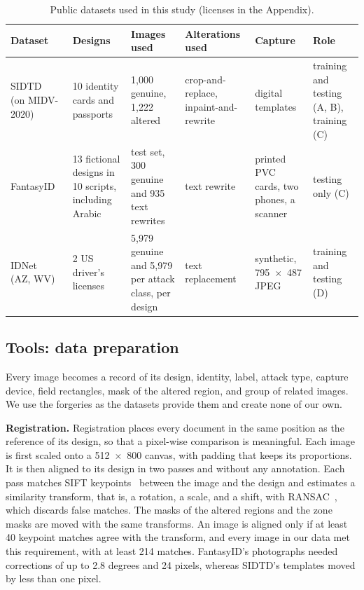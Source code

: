 \documentclass[12pt,a4paper]{article}
\begin{document}
\begin{table}[htbp]
\centering\footnotesize
\setlength{\tabcolsep}{3pt}
\renewcommand{\arraystretch}{1.1}
\caption{Public datasets used in this study (licenses in the Appendix).}
\label{tab:data}
\begin{tabular}{L{2.0cm}L{2.6cm}L{2.6cm}L{3.0cm}L{2.5cm}L{2.4cm}}
\toprule
Dataset & Designs & Images used & Alterations used & Capture & Role \\
\midrule
SIDTD~\cite{boned2024sidtd} (on MIDV-2020) & 10 identity cards and passports & 1,000 genuine, 1,222 altered & crop-and-replace, inpaint-and-rewrite & digital templates & training and testing (A, B), training (C) \\
FantasyID~\cite{korshunov2025fantasyid} & 13 fictional designs in 10 scripts, including Arabic & test set, 300 genuine and 935 text rewrites & text rewrite & printed PVC cards, two phones, a scanner & testing only (C) \\
IDNet~\cite{guan2024idnet} (AZ, WV) & 2 US driver's licenses & 5,979 genuine and 5,979 per attack class, per design & text replacement & synthetic, 795~$\times$~487 JPEG & training and testing (D) \\
\bottomrule
\end{tabular}
\end{table}


\subsection{Tools: data preparation}
\label{sec:prep}
Every image becomes a record of its design, identity, label, attack type, capture device, field rectangles, mask of the altered region, and group of related images. We use the forgeries as the datasets provide them and create none of our own.

\textbf{Registration.} Registration places every document in the same position as the reference of its design, so that a pixel-wise comparison is meaningful. Each image is first scaled onto a 512~$\times$~800 canvas, with padding that keeps its proportions. It is then aligned to its design in two passes and without any annotation. Each pass matches SIFT keypoints~\cite{lowe2004sift} between the image and the design and estimates a similarity transform, that is, a rotation, a scale, and a shift, with RANSAC~\cite{fischler1981ransac}, which discards false matches. The masks of the altered regions and the zone masks are moved with the same transforms. An image is aligned only if at least 40 keypoint matches agree with the transform, and every image in our data met this requirement, with at least 214 matches. FantasyID's photographs needed corrections of up to 2.8 degrees and 24 pixels, whereas SIDTD's templates moved by less than one pixel.
\end{document}
